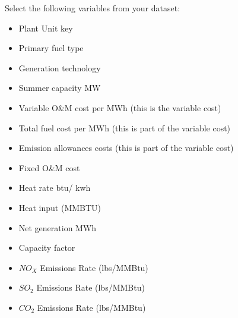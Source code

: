 \documentclass[11pt]{article}
\begin{document}
 Select the following variables from your dataset: 
			\begin{itemize}
			\item Plant Unit key
			\item Primary fuel type
			\item Generation technology
			\item Summer capacity MW
			\item Variable O\&M cost per MWh (this is the variable cost)
			\item Total fuel cost per MWh (this is part of the variable cost)
			\item Emission allowances costs (this is part of the variable cost)
			\item Fixed O\&M cost
			\item Heat rate btu/ kwh
			\item Heat input (MMBTU)
			\item Net generation MWh
			\item Capacity factor
			\item $NO_X$ Emissions Rate (lbs/MMBtu)
			\item $SO_2$ Emissions Rate (lbs/MMBtu)
			\item $CO_2$ Emissions Rate (lbs/MMBtu)
			\end{itemize}
\clearpage
\end{document}
